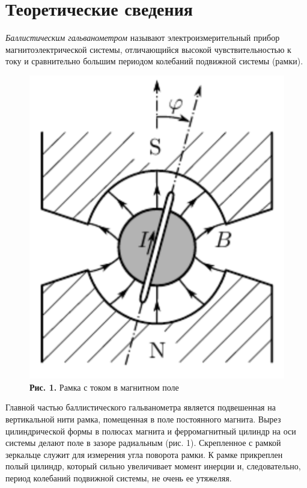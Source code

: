 \documentclass[a4paper,12pt]{article} %
\begin{document}
\section{Теоретические сведения}
\hfill \break \textit{Баллистическим гальванометром} называют электроизмерительный прибор магнитоэлектрической системы, отличающийся высокой чувствительностью к току и сравнительно большим периодом колебаний подвижной системы (рамки). 

\begin{figure}
\begin{center}
    \includegraphics[width=1\textwidth]{3.2.6_1.png}
    \textbf{Рис. 1.} Рамка с током в магнитном поле
\end{center}
\end{figure}

\hfill \break Главной частью баллистического гальванометра является подвешенная на вертикальной нити рамка, помещенная в поле постоянного магнита. Вырез цилиндрической формы в полюсах магнита и ферромагнитный цилиндр на оси системы делают поле в зазоре радиальным (рис. 1). Скрепленное с рамкой зеркальце служит для измерения угла поворота рамки. К рамке прикреплен полый цилиндр, который сильно увеличивает момент инерции и, следовательно, период колебаний подвижной системы, не очень ее утяжеляя.
\end{document}
